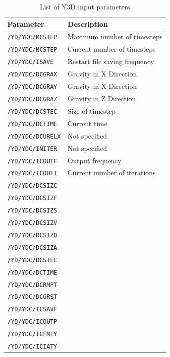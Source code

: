 \documentclass[12pt,twoside]{article}
\theoremstyle{break}
\begin{document}
\begin{table}[h!]
  \centering
  \begin{tabular}{ll}
    \toprule
    Parameter               & Description                   \\\hline
    \midrule  
    \texttt{/YD/YDC/MCSTEP} & Maximum number of timesteps   \\
    \texttt{/YD/YDC/NCSTEP} & Current number of timesteps   \\
    \texttt{/YD/YDC/ISAVE}  & Restart file saving frequency \\
    \texttt{/YD/YDC/DCGRAX} & Gravity in X Direction        \\
    \texttt{/YD/YDC/DCGRAY} & Gravity in X Direction        \\
    \texttt{/YD/YDC/DCGRAZ} & Gravity in Z Direction        \\
    \texttt{/YD/YDC/DCSTEC} & Size of timestep              \\
    \texttt{/YD/YDC/DCTIME} & Current time                  \\
    \texttt{/YD/YDC/DCURELX}& Not specified                 \\
    \texttt{/YD/YDC/INITER} & Not specified                 \\
    \texttt{/YD/YDC/ICOUTF} & Output frequency              \\
    \texttt{/YD/YDC/ICOUTI} & Current number of iterations  \\
    \texttt{/YD/YDC/DCSIZC} &                               \\
    \texttt{/YD/YDC/DCSIZF} &                               \\
    \texttt{/YD/YDC/DCSIZS} &                               \\
    \texttt{/YD/YDC/DCSIZV} &                               \\
    \texttt{/YD/YDC/DCSIZD} &                               \\
    \texttt{/YD/YDC/DCSIZA} &                               \\
    \texttt{/YD/YDC/DCSTEC} &                               \\
    \texttt{/YD/YDC/DCTIME} &                               \\
    \texttt{/YD/YDC/DCRMPT} &                               \\
    \texttt{/YD/YDC/DCGRST} &                               \\
    \texttt{/YD/YDC/ICSAVF} &                               \\
    \texttt{/YD/YDC/ICOUTP} &                               \\
    \texttt{/YD/YDC/ICFMTY} &                               \\
    \texttt{/YD/YDC/ICIATY} &                               \\\hline
    \bottomrule
  \end{tabular}
  \caption{List of Y3D input parameters}
  \label{tab:inpar}
\end{table}
\end{document}
